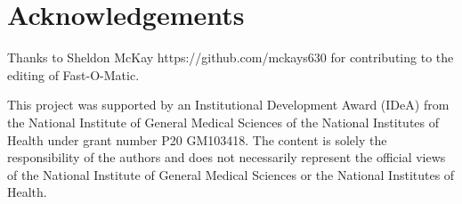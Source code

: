 \section{Acknowledgements}
Thanks to Sheldon McKay https://github.com/mckays630 for contributing to the editing of Fast-O-Matic.

This project was supported by an Institutional Development Award (IDeA) from the National Institute of General Medical Sciences of the National Institutes of Health under grant number P20 GM103418. The content is solely the responsibility of the authors and does not necessarily represent the official views of the National Institute of General Medical Sciences or the National Institutes of Health.
  